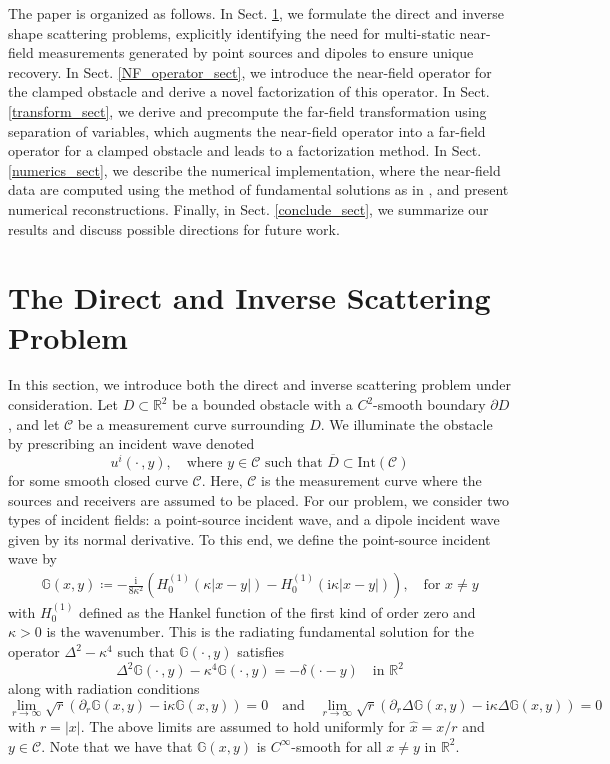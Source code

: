 \documentclass{article}
\begin{document}
The paper is organized as follows. In Sect. \ref{intro}, we formulate the direct and inverse shape scattering problems, explicitly identifying the need for multi-static near-field measurements generated by point sources and dipoles to ensure unique recovery. In Sect. \ref{NF_operator_sect}, we introduce the near-field operator for the clamped obstacle and derive a novel factorization of this operator. In Sect. \ref{transform_sect}, we derive and precompute the far-field transformation using separation of variables, which augments the near-field operator into a far-field operator for a clamped obstacle and leads to a factorization method. In Sect. \ref{numerics_sect}, we describe the numerical implementation, where the near-field data are computed using the method of fundamental solutions as in \cite{karageorghislesnic2024}, and present numerical reconstructions. Finally, in Sect. \ref{conclude_sect}, we summarize our results and discuss possible directions for future work.




\section{The Direct and Inverse Scattering Problem}\label{intro}
In this section, we introduce both the direct and inverse scattering problem under consideration. Let $D \subset \mathbb{R}^2$ be a bounded obstacle with a $C^2$-smooth boundary $\partial D$, and let $\mathcal{C}$ be a measurement curve surrounding $D$. We illuminate the obstacle by prescribing an incident wave denoted
\[
{u^{i}(\cdot \, , y), \quad \text{where }y\in \mathcal C\text{ such that }\overline D\subset \text{Int}(\mathcal C)}
\]
for some smooth closed curve $\mathcal C$. Here, $\mathcal C$ is the measurement curve where the sources and receivers are assumed to be placed. {For our problem, we consider two types of incident fields: a point-source incident wave, and a dipole incident wave given by its normal derivative.} To this end, we define the point-source incident wave by 
\begin{align}
\mathbb G(x,y)\coloneqq -\frac{\mathrm{i}}{8\kappa^2}\left(H_0^{(1)}(\kappa|x-y|)-H_0^{(1)}(\mathrm i\kappa|x-y|)\right),\quad\text{for } x\neq y
\end{align}
with $H_0^{(1)}$ defined as the Hankel function of the first kind of order zero and $\kappa>0$ is the wavenumber. This is the radiating fundamental solution for the operator $\Delta^2-\kappa^4$ such that $\mathbb G(\cdot \, ,y)$ satisfies
\[
\Delta^2\mathbb G(\cdot \, ,y)-\kappa^4\mathbb G(\cdot \, ,y)=-\delta(\cdot-y)\quad \text{in }\mathbb R^2
\]
along with radiation conditions
\[
\lim_{r\to\infty}\sqrt r(\partial_r \mathbb G(x,y)- \text{i}\kappa\mathbb G(x,y))=0\quad \text{and}\quad \lim_{r\to\infty}\sqrt r(\partial_r \Delta\mathbb  G(x,y)- \text{i}\kappa\Delta \mathbb G(x,y))=0
\]
with $r=|x|$. The above limits are assumed to hold uniformly for $\hat x=x/r$ and $y\in \mathcal C$. Note that we have that $\mathbb G(x,y)$ is  $C^{\infty}$-smooth for all $x\neq y$ in $\mathbb R^2$.
\end{document}
